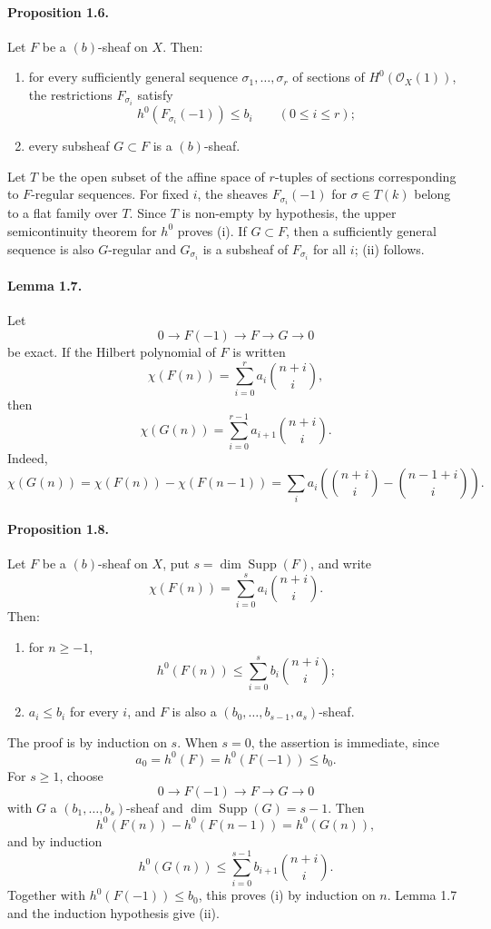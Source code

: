 \documentclass[12pt]{article}
\newcommand{\cO}{\mathcal O}
\begin{document}
\paragraph{Proposition 1.6.}
Let $F$ be a $(b)$-sheaf on $X$. Then:
\begin{enumerate}[label=\roman*)]
\item for every sufficiently general sequence $\sigma_1,\ldots,\sigma_r$ of sections of $H^0(\cO_X(1))$, the restrictions $F_{\sigma_i}$ satisfy
\[
h^0(F_{\sigma_i}(-1))\leq b_i\qquad(0\leq i\leq r);
\]
\item every subsheaf $G\subset F$ is a $(b)$-sheaf.
\end{enumerate}

Let $T$ be the open subset of the affine space of $r$-tuples of sections corresponding to $F$-regular sequences. For fixed $i$, the sheaves $F_{\sigma_i}(-1)$ for $\sigma\in T(k)$ belong to a flat family over $T$. Since $T$ is non-empty by hypothesis, the upper semicontinuity theorem for $h^0$ proves (i). If $G\subset F$, then a sufficiently general sequence is also $G$-regular and $G_{\sigma_i}$ is a subsheaf of $F_{\sigma_i}$ for all $i$; (ii) follows.

\paragraph{Lemma 1.7.}
Let
\[
0\to F(-1)\to F\to G\to0
\]
be exact. If the Hilbert polynomial of $F$ is written
\[
\chi(F(n))=\sum_{i=0}^r a_i\binom{n+i}{i},
\]
then
\[
\chi(G(n))=\sum_{i=0}^{r-1}a_{i+1}\binom{n+i}{i}.
\]
Indeed,
\[
\chi(G(n))=\chi(F(n))-\chi(F(n-1))
 =\sum_i a_i\left(\binom{n+i}{i}-\binom{n-1+i}{i}\right).
\]

\paragraph{Proposition 1.8.}
Let $F$ be a $(b)$-sheaf on $X$, put $s=\dim\operatorname{Supp}(F)$, and write
\[
\chi(F(n))=\sum_{i=0}^s a_i\binom{n+i}{i}.
\]
Then:
\begin{enumerate}[label=\roman*)]
\item for $n\geq -1$,
\[
h^0(F(n))\leq \sum_{i=0}^s b_i\binom{n+i}{i};
\]
\item $a_i\leq b_i$ for every $i$, and $F$ is also a $(b_0,\ldots,b_{s-1},a_s)$-sheaf.
\end{enumerate}

The proof is by induction on $s$. When $s=0$, the assertion is immediate, since
\[
a_0=h^0(F)=h^0(F(-1))\leq b_0.
\]
For $s\geq1$, choose
\[
0\to F(-1)\to F\to G\to0
\]
with $G$ a $(b_1,\ldots,b_s)$-sheaf and $\dim\operatorname{Supp}(G)=s-1$. Then
\[
h^0(F(n))-h^0(F(n-1))=h^0(G(n)),
\]
and by induction
\[
h^0(G(n))\leq\sum_{i=0}^{s-1} b_{i+1}\binom{n+i}{i}.
\]
Together with $h^0(F(-1))\leq b_0$, this proves (i) by induction on $n$. Lemma 1.7 and the induction hypothesis give (ii).
\end{document}
